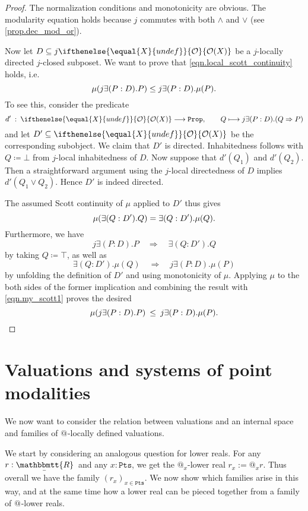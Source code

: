 \documentclass[reqno,11pt]{amsproc}
\makeatletter
\theoremstyle{plain}
\theoremstyle{definition}
\newcommand{\Const}[1]{\mathtt{#1}}
\newcommand{\ubar}[1]{\underaccent{\bar}{#1}}
\newcommand{\internal}[1]{\raisebox{-.03ex}{$\mathbbmtt{#1}$}}
\newcommand{\hs}{\hspace{1pt}}
\newcommand{\trr}{\internal{R}}
\newcommand{\tlrr}{\ubar{\trr}\hs}
\newcommand{\prop}{\Const{Prop}}
\newcommand{\pt}{x}
\newcommand{\Op}[1][undef]{\ifthenelse{\equal{#1}{undef}}{\mathcal{O}}{\mathcal{O}(#1)}}
\newcommand{\pts}{\mathtt{Pts}}		%
\newcommand{\atsymbol}{{@}}
\newcommand{\at}[1][\pt]{\atsymbol_{#1}}
\newcommand{\imp}{\Rightarrow}
\let\originalleft\left
\let\originalright\right
\renewcommand{\left}{\mathopen{}\mathclose\bgroup\originalleft}
\renewcommand{\right}{\aftergroup\egroup\originalright}
\numberwithin{equation}{section}
\makeatother
\begin{document}
\begin{proof}
	The normalization conditions and monotonicity are obvious. The modularity equation holds because $j$ commutes with both $\land$ and $\lor$ (see \cref{prop.dec_mod_or}).

	Now let $D \subseteq j \Op[X]$ be a $j$-locally directed $j$-closed subposet. We want to prove that \eqref{eqn.local_scott_continuity} holds, i.e.\
	\[
		\mu\left( j \exists (P : D) . P \right) \leq j \exists (P : D). \mu(P).
	\]
To see this, consider the predicate
	\[
		d' \: : \: \Op[X] \longrightarrow \prop, \qquad Q \longmapsto j \exists (P : D) . (Q \imp P)
	\]
	and let $D'\subseteq\Op[X]$ be the corresponding subobject. We claim that $D'$ is directed. Inhabitedness follows with $Q \coloneqq\bot$ from $j$-local inhabitedness of $D$. Now suppose that $d'(Q_1)$ and $d'(Q_2)$. Then a straightforward argument using the $j$-local directedness of $D$ implies $d'(Q_1 \lor Q_2)$. Hence $D'$ is indeed directed.

	The assumed Scott continuity of $\mu$ applied to $D'$ thus gives
	\begin{equation}\label{eqn.my_scott1}
		\mu\left( \exists (Q : D') . Q \right) = \exists (Q : D') . \mu(Q).
	\end{equation}
	Furthermore, we have
	\[
		j \exists (P : D) . P \quad \Longrightarrow \quad \exists (Q : D') . Q
	\]
	by taking $Q \coloneqq \top$, as well as
	\[
		\exists (Q : D') . \mu(Q) \quad \Longrightarrow \quad j \exists (P : D) . \mu(P)
	\]
	by unfolding the definition of $D'$ and using monotonicity of $\mu$. Applying $\mu$ to the both sides of the former implication and combining the result with \eqref{eqn.my_scott1} proves the desired
	\[
		\mu\left( j \exists (P : D) . P \right) \: \le \: j \exists (P : D) . \mu(P).
\qedhere
	\]
\end{proof}


\section{Valuations and systems of point modalities}

We now want to consider the relation between valuations and an internal space and families of $\at[]$-locally defined valuations.

We start by considering an analogous question for lower reals. For any $r : \tlrr$ and any $\pt : \pts$, we get the $\at$-lower real $r_\pt := \at r$. Thus overall we have the family $(r_\pt)_{\pt \in \pts}$. We now show which families arise in this way, and at the same time how a lower real can be pieced together from a family of $\at[]$-lower reals.
\end{document}
